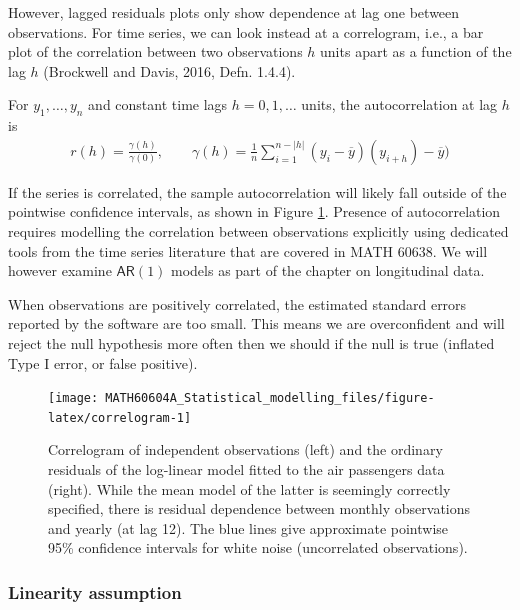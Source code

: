 \documentclass[
  11pt,
  letterpaper,
]{book}
\theoremstyle{definition}
\theoremstyle{definition}
\theoremstyle{definition}
\theoremstyle{remark}
\begin{document}
However, lagged residuals plots only show dependence at lag one between observations. For time series, we can look instead at a correlogram, i.e., a bar plot of the correlation between two observations \(h\) units apart as a function of the lag \(h\) (Brockwell and Davis, 2016, Defn. 1.4.4).

For \(y_1, \ldots, y_n\) and constant time lags \(h=0, 1, \ldots\) units, the autocorrelation at lag \(h\) is
\begin{align*}
r(h) = \frac{\gamma(h)}{\gamma(0)}, \qquad \gamma(h) = \frac{1}{n}\sum_{i=1}^{n-|h|} (y_i-\overline{y})(y_{i+h}) - \overline{y}) 
\end{align*}

If the series is correlated, the sample autocorrelation will likely fall outside of the pointwise confidence intervals, as shown in Figure \ref{fig:correlogram}. Presence of autocorrelation requires modelling the correlation between observations explicitly using dedicated tools from the time series literature that are covered in MATH 60638. We will however examine \(\mathsf{AR}(1)\) models as part of the chapter on longitudinal data.

When observations are positively correlated, the estimated standard errors reported by the software are too small. This means we are overconfident and will reject the null hypothesis more often then we should if the null is true (inflated Type I error, or false positive).

\begin{figure}

{\centering \texttt{[image: MATH60604A\_Statistical\_modelling\_files/figure-latex/correlogram-1]} 

}

\caption{Correlogram of independent observations (left) and the ordinary residuals of the log-linear model fitted to the air passengers data (right). While the mean model of the latter is seemingly correctly specified, there is residual dependence between monthly observations and yearly (at lag 12). The blue lines give approximate pointwise 95\% confidence intervals for white noise (uncorrelated observations).}\label{fig:correlogram}
\end{figure}

\hypertarget{linearity-assumption}{%
\subsubsection{Linearity assumption}\label{linearity-assumption}}
\end{document}
